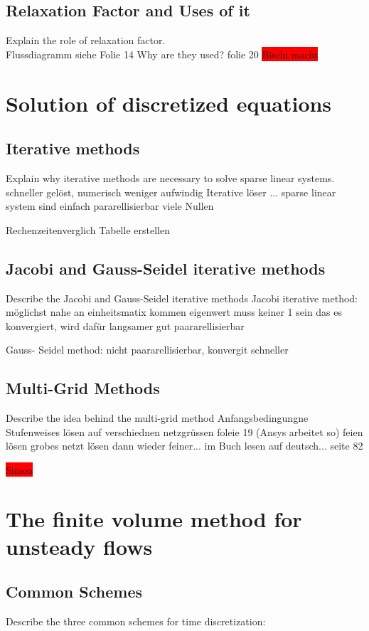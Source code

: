 \documentclass[a4paper]{scrartcl}
\begin{document}
\subsection{Relaxation Factor and Uses of it}
Explain the role of relaxation factor. \\

Flussdiagramm siehe Folie 14
 Why are they used?
folie 20
\colorbox{red}{Bischi macht}


\section{Solution of discretized equations}


\subsection{Iterative methods} 
Explain why iterative methods are necessary to
solve sparse linear systems.
schneller gelöst, numerisch weniger aufwindig
Iterative löser ...
sparse linear system sind einfach pararellisierbar viele Nullen

Rechenzeitenverglich Tabelle erstellen

\subsection{Jacobi and Gauss-Seidel iterative methods}
Describe the Jacobi and Gauss-Seidel iterative methods
Jacobi iterative method: 
möglichst nahe an einheitsmatix kommen
eigenwert muss keiner 1 sein das es konvergiert, wird dafür langsamer 
gut paararellisierbar

Gauss- Seidel method: 
nicht paararellisierbar, konvergit schneller

\subsection{Multi-Grid Methods} 
Describe the idea behind the multi-grid method
Anfangsbedingungne 
Stufenweises lösen auf verschiednen netzgrüssen
foleie 19 (Ansys arbeitet so)
feien lösen
grobes netzt lösen
dann wieder feiner...
im Buch lesen auf deutsch... seite 82

\colorbox{red}{Simon}

\section{The finite volume method for unsteady flows}
\subsection{Common Schemes} Describe the three common schemes for time
discretization:
\end{document}
